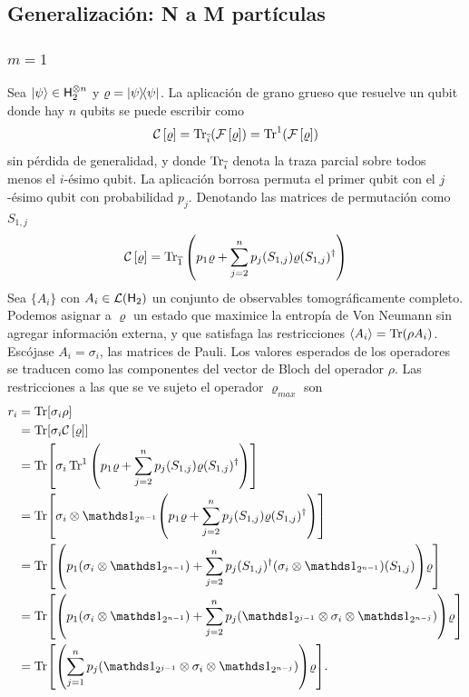 \subsection{Generalización: N a M partículas}

\subsubsection{$m=1$}
Sea $\ket{\psi}\in{\sf H}_{2}^{\otimes n}$ y $\varrho=\dyad{\psi}$. La aplicación de grano grueso que resuelve un qubit donde hay $n$ qubits se puede escribir como
\begin{equation*}
    \mathcal{C}\left[\varrho\right]=\Tr_{\overline{i}}(\mathcal{F}\left[\varrho\right])=\Tr^{1}(\mathcal{F}\left[\varrho\right])
\end{equation*}
sin pérdida de generalidad, y donde $\Tr_{\overline{i}}$ denota la traza parcial sobre todos menos el $i$-ésimo qubit. La aplicación borrosa permuta el primer qubit con el $j$-ésimo qubit con probabilidad $p_{j}$. Denotando las matrices de permutación como $S_{1,j}$
\begin{equation*}
    \mathcal{C}\left[\varrho\right]=\Tr_{\overline{1}}\qty(p_{1}\varrho+\sum_{j=2}^{n}p_{j}(S_{1,j})\varrho(S_{1,j})^{\dagger})
\end{equation*}
Sea $\{A_{i}\}$ con $A_{i}\in\mathcal{L}({\sf H}_{2})$ un conjunto de observables tomográficamente completo. Podemos asignar a $\varrho$ un estado que maximice la entropía de Von Neumann sin agregar información externa, y que satisfaga las restricciones $\expval{A_{i}}=\Tr(\rho A_{i})$. Escójase ${A_{i}}={\sigma_{i}}$, las matrices de Pauli. Los valores esperados de los operadores se traducen como las componentes del vector de Bloch del operador $\rho$. Las restricciones a las que se ve sujeto el operador $\varrho_{max}$ son
\begin{align*}
    r_{i}&=\Tr[\sigma_{i}\rho]\\
    &=\Tr[\sigma_{i}\CG{\varrho}]\\
    &=\Tr[\sigma_{i}\Tr^{1}\qty(p_{1}\varrho+\sum_{j=2}^{n}p_{j}(S_{1,j})\varrho(S_{1,j})^{\dagger})]\\
    &=\Tr[\sigma_{i}\otimes\Id_{2^{n-1}}\qty(p_{1}\varrho+\sum_{j=2}^{n}p_{j}(S_{1,j})\varrho(S_{1,j})^{\dagger})]\\
    &=\Tr[\qty(p_{1}(\sigma_{i}\otimes\Id_{2^{n-1}})+\sum_{j=2}^{n}p_{j}(S_{1,j})^{\dagger}(\sigma_{i}\otimes\Id_{2^{n-1}})(S_{1,j}))\varrho]\\
    &=\Tr[\qty(p_{1}(\sigma_{i}\otimes\Id_{2^{n-1}})+\sum_{j=2}^{n}p_{j}(\Id_{2^{j-1}}\otimes\sigma_{i}\otimes\Id_{2^{n-j}}))\varrho]\\
    &=\Tr[\qty(\sum_{j=1}^{n}p_{j}(\Id_{2^{j-1}}\otimes\sigma_{i}\otimes\Id_{2^{n-j}}))\varrho].
\end{align*}

